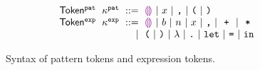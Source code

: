 \begin{figure}[t]
  \vspace{-3px}
  \[
  \arraycolsep=3pt\begin{array}{rlrl}
      \mathsf{Token^{\pat}} & \kappa^{\pat} & ::= &
        \shole ~\vert~
        \svar{x} ~\vert~
        \sprod{}{} ~\vert~
        \texttt{(} ~\vert~
        \texttt{)} \\
      \mathsf{Token^{\expr}} & \kappa^{\expr} & ::= &
        \shole ~\vert~
        \sboollit{b} ~\vert~
        \snumlit{n} ~\vert~
        \svar{x} ~\vert~
        \sprod{}{} ~\vert~
        \splus{}{} ~\vert~
        \smult{}{} \\
      & & \vert &
        \texttt{(} ~\vert~
        \texttt{)} ~\vert~
        \lambda ~\vert~
        \texttt{.} ~\vert~
        \texttt{let} ~\vert~
        \texttt{=} ~\vert~
        \texttt{in}
  \end{array}\]
  \caption{
    Syntax of pattern tokens and expression tokens.
  }
  \label{fig:language-syntax}
\end{figure}